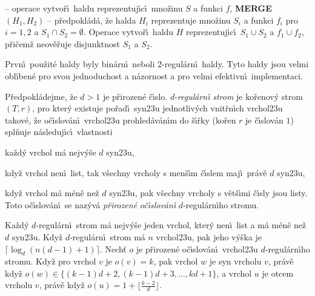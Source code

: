  -- operace vytvo\v r\'\i\ haldu 
reprezentuj\'\i c\'\i\ mno\v zinu $S$ a funkci $f$,\newline 
{\bf MERGE$(H_1,H_2)$} -- p\v redpokl\'ad\'a, \v ze halda $H_i$ reprezentuje 
mno\v zinu $S_i$ a funkci $f_i$ pro $i=1,2$ a $S_1\cap S_2=\emptyset$. Operace 
vytvo\v r\'\i\ haldu $H$ reprezentuj\'\i c\'\i\ $S_1\cup S_2$ a $
f_1\cup f_2$, 
p\v ri\v cem\v z neov\v e\v ruje disjunktnost $S_1$ a $S_2$.
\newpage

\centerline{}
\bigskip

\flushpar Prvn\'\i\ pou\v zit\'e haldy byly bin\'arn\'\i\ neboli $
2$-regul\'arn\'\i\ haldy. 
Tyto haldy jsou velmi obl\'\i ben\'e pro svou jednoduchost a 
n\'azornost a pro velmi efektivn\'\i\ implementaci.
\medskip

\flushpar P\v redpokl\'adejme, \v ze $d>1$ je p\v rirozen\'e \v c\'\i slo. 
$d$-\emph{regul\'arn\'\i} \emph{strom} je ko\v renov\'y strom 
$(T,r)$, pro kter\'y existuje po\v rad\'\i\ syn\accent23u 
jednotliv\'ych vnit\v rn\'\i ch vrchol\accent23u takov\'e, \v ze 
o\v c\'\i slov\'an\'\i\ vrchol\accent23u pro\-hle\-d\'a\-v\'an\'\i m do \v s\'\i\v rky 
(ko\v ren $r$ je \v c\'\i slov\'an $1$) spl\v nuje n\'asleduj\'\i c\'\i\ vlastnosti
\roster
\item
ka\v zd\'y vrchol m\'a nejv\'y\v se $d$ syn\accent23u,
\item
kdy\v z vrchol nen\'\i\ list, tak v\v sechny vrcholy s men\v s\'\i m 
\v c\'\i slem maj\'\i\ pr\'av\v e $d$ syn\accent23u,
\item
kdy\v z vrchol m\'a m\'en\v e ne\v z $d$ syn\accent23u, pak v\v sechny 
vrcholy s v\v et\v s\'\i mi \v c\'\i sly jsou listy.
\endroster
Toto o\v c\'\i slov\'an\'\i\ se naz\'yv\'a \emph{p\v rirozen\'e} 
\emph{o\v c\'\i slov\'an\'\i} $d$-regul\'arn\'\i ho stromu. 
\medskip

Ka\v zd\'y $d$-regul\'arn\'\i\ strom m\'a nejv\'y\v se jeden 
vrchol, kter\'y nen\'\i\ list a m\'a m\'en\v e ne\v z $d$ syn\accent23u. Kdy\v z 
$d$-regul\'arn\'\i\ strom m\'a $n$ vrchol\accent23u, pak jeho 
v\'y\v ska je $\lceil\log_d(n(d-1)+1)\rceil$. Nech\v t $o$ je p\v rirozen\'e o\v c\'\i slov\'an\'\i\ 
vrchol\accent23u $d$-regul\'arn\'\i ho stromu. Kdy\v z pro vrchol 
$v$ je $o(v)=k$, pak vrchol $w$ je syn vrcholu $v$, pr\'av\v e 
kdy\v z $o(w)\in \{(k-1)d+2,(k-1)d+3,\dots,kd+1\}$, a vrchol $u$ je 
otcem vrcholu $v$, pr\'av\v e kdy\v z $o(u)=1+\lfloor\frac {k-2}d
\rfloor$. 
\endproclaim

